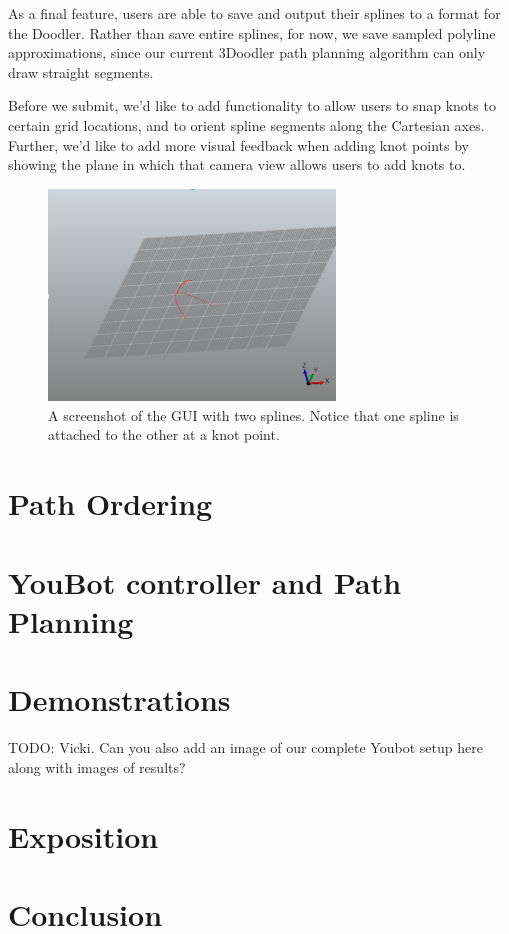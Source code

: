 \documentclass[conference]{acmsiggraph}
\begin{document}
As a final feature, users are able to save and output their splines to a format for the Doodler.  Rather than save entire splines, for now, we save sampled polyline approximations, since our current 3Doodler path planning algorithm can only draw straight segments.

Before we submit, we'd like to add functionality to allow users to snap knots to certain grid locations, and to orient spline segments along the Cartesian axes.  Further, we'd like to add more visual feedback when adding knot points by showing the plane in which that camera view allows users to add knots to.

\begin{figure}[ht]
  \centering
  \includegraphics[width=3.0in]{images/GUI.png}
  \caption{A screenshot of the GUI with two splines.  Notice that one spline is attached to the other at a knot point.}
  \label{fig:GUI}
\end{figure}

\section{Path Ordering}

\section{YouBot controller and Path Planning}

\section{Demonstrations}
TODO: Vicki.  Can you also add an image of our complete Youbot setup here along with images of results?


\section{Exposition}



\section{Conclusion}






\end{document}
